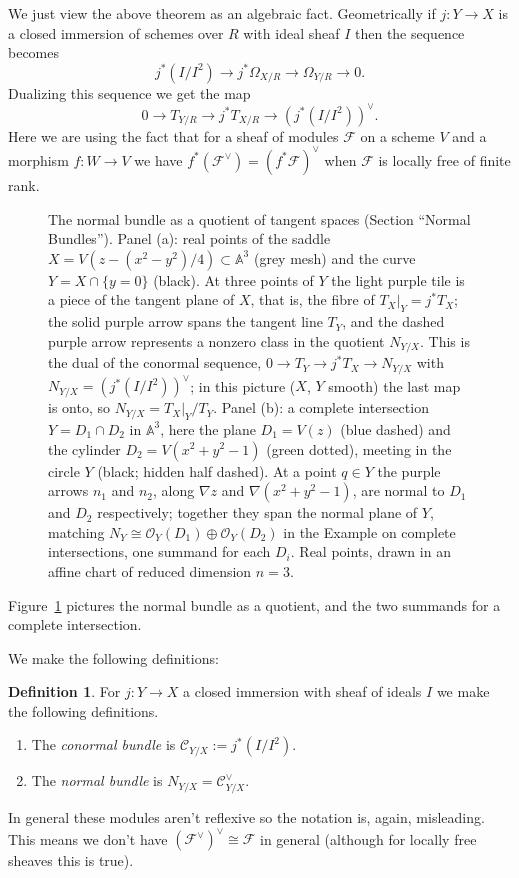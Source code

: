 \documentclass[12pt]{article}
\numberwithin{equation}{section}
\theoremstyle{definition}
\newtheorem{definition}[theorem]{Definition}
\theoremstyle{remark}
\newcommand{\Ocal}{\mathcal{O}}
\renewcommand{\AA}{\mathbb{A}}
\newcommand{\Fcal}{\mathcal{F}}
\begin{document}
We just view the above theorem as an algebraic fact. 
Geometrically if $j: Y\to X$ is a closed immersion of schemes over $R$ with ideal sheaf $I$ then the sequence becomes 
 $$j^*(I/I^2) \to j^*\Omega_{X/R} \to \Omega_{Y/R} \to 0.$$
Dualizing this sequence we get the map 
 $$ 0 \to T_{Y/R} \to j^*T_{X/R} \to \left( j^*( I/I^2) \right)^{\vee}. $$
Here we are using the fact that for a sheaf of modules $\Fcal$ on a scheme $V$ and a morphism $f:W\to V$ we have $f^*(\Fcal^{\vee}) = (f^*\Fcal)^{\vee}$ when $\Fcal$ is locally free of finite rank.

\begin{figure}[H]
\centering

\caption{The normal bundle as a quotient of tangent spaces (Section ``Normal Bundles''). Panel (a): real points of the saddle $X=V(z-(x^2-y^2)/4)\subset\AA^3$ (grey mesh) and the curve $Y=X\cap\{y=0\}$ (black). At three points of $Y$ the light purple tile is a piece of the tangent plane of $X$, that is, the fibre of $T_X|_Y=j^*T_X$; the solid purple arrow spans the tangent line $T_Y$, and the dashed purple arrow represents a nonzero class in the quotient $N_{Y/X}$. This is the dual of the conormal sequence, $0\to T_Y\to j^*T_X\to N_{Y/X}$ with $N_{Y/X}=(j^*(I/I^2))^\vee$; in this picture ($X$, $Y$ smooth) the last map is onto, so $N_{Y/X}=T_X|_Y/T_Y$. Panel (b): a complete intersection $Y=D_1\cap D_2$ in $\AA^3$, here the plane $D_1=V(z)$ (blue dashed) and the cylinder $D_2=V(x^2+y^2-1)$ (green dotted), meeting in the circle $Y$ (black; hidden half dashed). At a point $q\in Y$ the purple arrows $n_1$ and $n_2$, along $\nabla z$ and $\nabla(x^2+y^2-1)$, are normal to $D_1$ and $D_2$ respectively; together they span the normal plane of $Y$, matching $N_{Y}\cong\Ocal_Y(D_1)\oplus\Ocal_Y(D_2)$ in the Example on complete intersections, one summand for each $D_i$. Real points, drawn in an affine chart of reduced dimension $n=3$.}\label{fig:normal-bundle}
\end{figure}
Figure~\ref{fig:normal-bundle} pictures the normal bundle as a quotient, and the two summands for a complete intersection.

We make the following definitions:
\begin{definition}
	For $j:Y\to X$ a closed immersion with sheaf of ideals $I$ we make the following definitions.
	\begin{enumerate}
		\item The \emph{conormal bundle} is $\mathcal{C}_{Y/X} := j^*(I/I^2)$. 
	    \item The \emph{normal bundle} is $N_{Y/X} = \mathcal{C}_{Y/X}^{\vee}$.
	\end{enumerate}
\end{definition}
In general these modules aren't reflexive so the notation is, again, misleading. 
This means we don't have $(\Fcal^{\vee})^{\vee} \cong \Fcal$ in general (although for locally free sheaves this is true).
\end{document}

